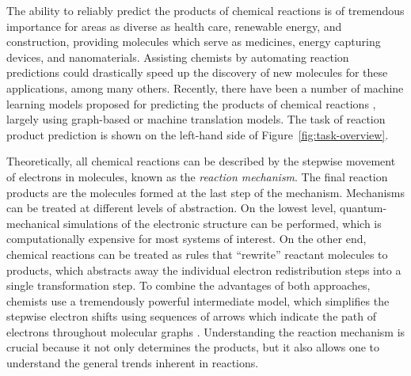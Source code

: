 
The ability to reliably predict the products of chemical reactions is of tremendous importance for areas as diverse as health care, renewable energy, and construction, providing molecules which serve as medicines, energy capturing devices, and nanomaterials. 
Assisting chemists by automating reaction predictions could drastically speed up the discovery of new molecules for these applications, among many others. Recently, there have been a number of machine learning models proposed for predicting the products of chemical reactions \cite{coley2017prediction,jin2017predicting,schwaller2017found,neural-symbolic,segler2018planning,wei2016neural}, largely using graph-based or machine translation models. The task of reaction product prediction is shown on the left-hand side of Figure~\ref{fig:task-overview}.

Theoretically, all chemical reactions can be described by the stepwise movement of electrons in molecules, known as the \emph{reaction mechanism}. The final reaction products are the molecules formed at the last step of the mechanism. 
Mechanisms can be treated at different levels of abstraction. On the lowest level, quantum-mechanical simulations of the electronic structure can be performed, which is computationally expensive for most systems of interest. 
On the other end, chemical reactions can be treated as rules that ``rewrite'' reactant molecules to products, which abstracts away the individual electron redistribution steps into a single transformation step. 
To combine the advantages of both approaches, chemists use a tremendously powerful intermediate model, which simplifies the stepwise electron shifts using sequences of arrows which indicate the path of electrons throughout molecular graphs \cite{herges1994organizing}. 
Understanding the reaction mechanism is crucial because it not only determines the products, but it also allows one to understand the general trends inherent in reactions. %


